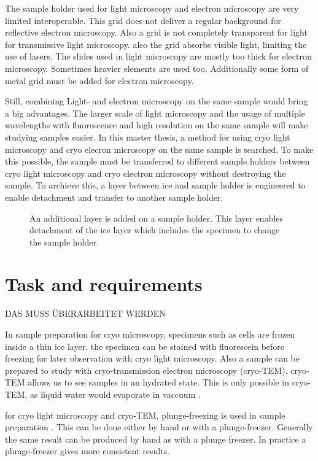 The sample holder used for light microscopy and electron microscopy are very limited interoperable. This grid does not deliver a regular background for reflective electron microscopy. Also a grid is not completely transparent for light for transmissive light microscopy. also the grid absorbs visible light, limiting the use of lasers. The slides used in light microscopy are mostly too thick for electron microscopy. Sometimes heavier elements are used too. Additionally some form of metal grid must be added for electron microscopy. 

Still, combining Light- and electron microscopy on the same sample would bring a big advantages. The larger scale of light microscopy and the usage of multiple wavelengths with fluorescence and high resolution on the same sample will make studying samples easier. In this master thesis, a method for using cryo light microscopy and cryo elecron microscopy on the same sample is searched. To make this possible, the sample must be transferred to different sample holders between cryo light microscopy and cryo electron microscopy without destroying the sample. To archieve this, a layer between  ice and sample holder is engineered to enable detachment and transfer to another sample holder.

\begin{figure}[hbt!]
	\centering
	
	\caption{An additional layer is added on a sample holder. This layer enables detachment of the ice layer which includes the specimen to change the sample holder.}
	\label{fig:layersingeneral}
\end{figure}


\section{Task and requirements}

DAS MUSS ÜBERARBEITET WERDEN

In sample preparation for cryo microscopy, specimens such as cells are frozen inside a thin ice layer. the specimen can be stained with fluorescein before freezing for later observation with cryo light microscopy. Also a sample can be prepared to study with cryo-transmission electron microscopy (cryo-TEM). cryo-TEM allows us to see samples in an hydrated state. This is only possible in cryo-TEM, as liquid water would evaporate in vaccuum \cite{Danino.2012}.

for cryo light microscopy and cryo-TEM, plunge-freezing is used in sample preparation \cite{Danino.2012} \cite{Faoro.2018}. This can be done either by hand or with a plunge-freezer. Generally the same result can be produced by hand as with a plunge freezer. In practice a plunge-freezer gives more consistent results.

